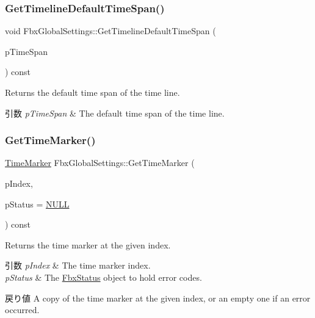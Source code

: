 \subsubsection{\texorpdfstring{Get\+Timeline\+Default\+Time\+Span()}{GetTimelineDefaultTimeSpan()}}
{\footnotesize\ttfamily void Fbx\+Global\+Settings\+::\+Get\+Timeline\+Default\+Time\+Span (\begin{DoxyParamCaption}\item[{\hyperlink{class_fbx_time_span}{Fbx\+Time\+Span} \&}]{p\+Time\+Span }\end{DoxyParamCaption}) const}

Returns the default time span of the time line. 
\begin{DoxyParams}{引数}
{\em p\+Time\+Span} & The default time span of the time line. \\
\hline
\end{DoxyParams}
\mbox{\label{class_fbx_global_settings_a915130672bba5a01e91d88a52338f1a3}} 
\subsubsection{\texorpdfstring{Get\+Time\+Marker()}{GetTimeMarker()}}
{\footnotesize\ttfamily \hyperlink{struct_fbx_global_settings_1_1_time_marker}{Time\+Marker} Fbx\+Global\+Settings\+::\+Get\+Time\+Marker (\begin{DoxyParamCaption}\item[{int}]{p\+Index,  }\item[{\hyperlink{class_fbx_status}{Fbx\+Status} $\ast$}]{p\+Status = {\ttfamily \hyperlink{fbxarch_8h_a070d2ce7b6bb7e5c05602aa8c308d0c4}{N\+U\+LL}} }\end{DoxyParamCaption}) const}

Returns the time marker at the given index. 
\begin{DoxyParams}{引数}
{\em p\+Index} & The time marker index. \\
\hline
{\em p\+Status} & The \hyperlink{class_fbx_status}{Fbx\+Status} object to hold error codes. \\
\hline
\end{DoxyParams}
\begin{DoxyReturn}{戻り値}
A copy of the time marker at the given index, or an empty one if an error occurred. 
\end{DoxyReturn}
\mbox{\label{class_fbx_global_settings_ac2b055f41b43ce8fb75453d445297765}} 
